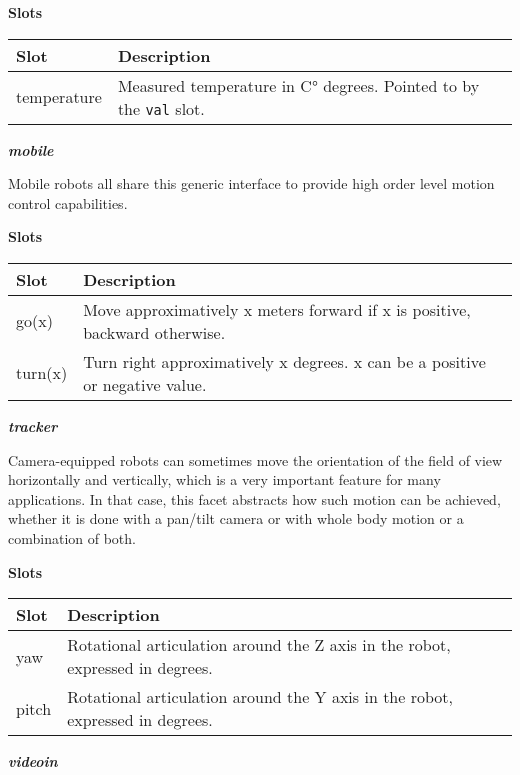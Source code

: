 \documentclass[a4paper]{article}
\begin{document}
{\sffamily\bfseries
Slots}

\begin{flushleft}
\tablehead{}
\begin{supertabular}{|m{2.98cm}|m{12.31cm}|}
\hline
\sffamily\bfseries Slot &
\sffamily\bfseries Description\\\hline
temperature &
\sffamily Measured temperature in C° degrees.
Pointed to by the \texttt{val} slot.\\\hline
\end{supertabular}
\end{flushleft}
{\sffamily\bfseries\itshape
mobile}

{\sffamily
Mobile robots all share this generic interface to provide high order
level motion control capabilities.}

{\sffamily\bfseries
Slots}

\begin{flushleft}
\tablehead{}
\begin{supertabular}{|m{3.293cm}|m{11.997cm}|}
\hline
\sffamily\bfseries Slot &
\sffamily\bfseries Description\\\hline
go(x) &
\sffamily Move approximatively x meters forward
if x is positive, backward otherwise.\\\hline
turn(x) &
\sffamily Turn right approximatively x degrees.
x can be a positive or negative value.\\\hline
\end{supertabular}
\end{flushleft}
{\sffamily\bfseries\itshape
tracker}

{\sffamily
Camera-equipped robots can sometimes move the orientation of the field
of view horizontally and vertically, which is a very important feature
for many applications. In that case, this facet abstracts how such
motion can be achieved, whether it is done with a pan/tilt camera or
with whole body motion or a combination of both.}

{\sffamily\bfseries
Slots}

\begin{flushleft}
\tablehead{}
\begin{supertabular}{|m{3.293cm}|m{11.997cm}|}
\hline
\sffamily\bfseries Slot &
\sffamily\bfseries Description\\\hline
yaw &
\sffamily Rotational articulation around the Z
axis in the robot, expressed in degrees.\\\hline
pitch &
\sffamily Rotational articulation around the Y
axis in the robot, expressed in degrees.\\\hline
\end{supertabular}
\end{flushleft}
{\sffamily\bfseries\itshape
videoin}
\end{document}
